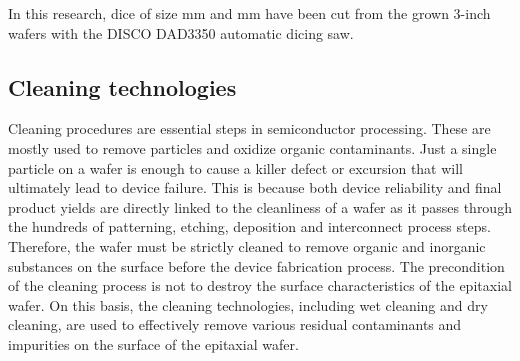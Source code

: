 In this research, dice of size  \unit{\mm} and  \unit{\mm} have been cut from the grown 3-inch wafers  with the DISCO DAD3350 automatic dicing saw.

\subsection{Cleaning technologies}
Cleaning procedures are essential steps in semiconductor processing. These are mostly used to remove particles and oxidize organic contaminants. Just a single particle on a  wafer is enough to cause a killer defect or excursion that will ultimately lead to device failure. This is because both device reliability and final product yields are directly linked to the cleanliness of a wafer as it passes through the hundreds of patterning, etching, deposition and interconnect process steps. Therefore, the wafer must be strictly cleaned to remove organic and inorganic substances on the surface before the device fabrication process. The precondition of the cleaning process is not to destroy the surface characteristics of the epitaxial wafer. On this basis, the cleaning technologies, including wet cleaning and  dry cleaning, are used to effectively remove various residual contaminants and impurities on the surface of the epitaxial  wafer. 

